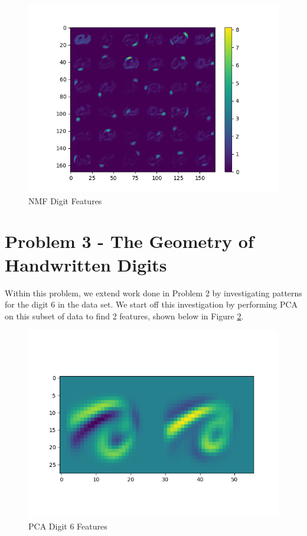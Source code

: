 \documentclass{article}[12pt]
\begin{document}
   \begin{figure}[ht]
   \centerline{
   \includegraphics[scale=0.7]{p2/NMF_features_digits.png}}
   \caption{NMF Digit Features}
   \label{fig:nmf_dig_f}
   \end{figure}
   
   \newpage
   \section{Problem 3 - The Geometry of Handwritten Digits}
   Within this problem, we extend work done in Problem 2 by investigating patterns for the digit 6 in the data set. We start off this investigation by performing PCA on this subset of data to find 2 features, shown below in Figure \ref{fig:pca_f6}. 
   
   \begin{figure}[ht]
   \centerline{
   \includegraphics[scale=0.7]{p3/pca_features_6.png}}
   \caption{PCA Digit 6 Features}
   \label{fig:pca_f6}
   \end{figure}
   
\end{document}
